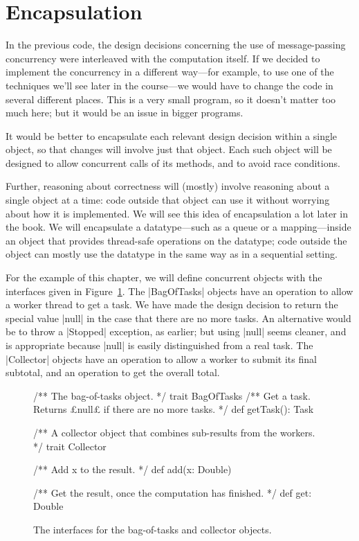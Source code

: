 \section{Encapsulation}
\label{sec:bag-of-tasks-encapsulation}

In the previous code, the design decisions concerning the use of
message-passing concurrency were interleaved with the computation itself.  If
we decided to implement the concurrency in a different way---for example, to
use one of the techniques we'll see later in the course---we would have to
change the code in several different places.  This is a very small program, so
it doesn't matter too much here; but it would be an issue in bigger programs.

It would be better to encapsulate each relevant design decision within a
single object, so that changes will involve just that object.  Each such
object will be designed to allow concurrent calls of its methods, and to avoid
race conditions.  

Further, reasoning about correctness will (mostly) involve reasoning about a
single object at a time: code outside that object can use it without worrying
about how it is implemented.  We will see this idea of encapsulation a lot
later in the book.  We will encapsulate a datatype---such as a queue or a
mapping---inside an object that provides thread-safe operations on the
datatype; code outside the object can mostly use the datatype in the same way
as in a sequential setting.  


For the example of this chapter, we will define concurrent objects with the
interfaces given in Figure~\ref{fig:BoT-interfaces}.  The |BagOfTasks| objects
have an operation to allow a worker thread to get a task.  We have made the
design decision to return the special value |null| in the case that there are
no more tasks.  An alternative would be to throw a |Stopped| exception, as
earlier; but using |null| seems cleaner, and is appropriate because |null| is
easily distinguished from a real task.  The |Collector| objects have an
operation to allow a worker to submit its final subtotal, and an operation to
get the overall total.


\begin{figure}
\begin{scala}
  /** The bag-of-tasks object. */
  trait BagOfTasks{
    /** Get a task.  Returns £null£ if there are no more tasks. */
    def getTask(): Task 
  }  

  /** A collector object that combines sub-results from the workers. */
  trait Collector{
    /** Add x to the result. */
    def add(x: Double) 

    /** Get the result, once the computation has finished. */
    def get: Double 
  }
\end{scala}
\caption{The interfaces for the bag-of-tasks and collector objects.}
\label{fig:BoT-interfaces}
\end{figure}

